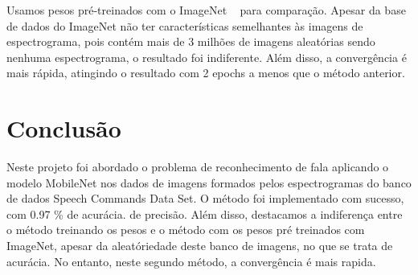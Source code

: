 \documentclass{bmvc2k}
\begin{document}
Usamos pesos pré-treinados com o ImageNet ~\cite{imagenet} para comparação. Apesar da base de dados do ImageNet não ter características semelhantes às imagens de espectrograma, pois contém mais de 3 milhões de imagens aleatórias sendo nenhuma espectrograma, o resultado foi indiferente. Além disso, a convergência é mais rápida, atingindo o resultado com 2 epochs a menos que o método anterior.


\section{Conclusão}

Neste projeto foi abordado o problema de reconhecimento de fala aplicando o modelo MobileNet nos dados de imagens formados pelos espectrogramas do banco de dados Speech Commands Data Set. O método foi implementado com sucesso, com 0.97 \% de acurácia.
de precisão. Além disso, destacamos a indiferença entre o método treinando os pesos e o método com os pesos pré treinados com ImageNet, apesar da aleatóriedade deste banco de imagens, no que se trata de acurácia. No entanto, neste segundo método, a convergência é mais rapida.

\newpage

\end{document}

